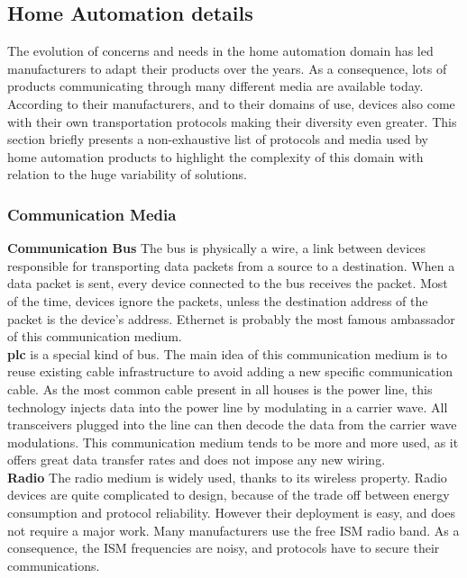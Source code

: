 \subsection{Home Automation details}
\label{subsection:homeAutomationDetails}

The evolution of concerns and needs in the home automation domain has led manufacturers to adapt their products over the years. As a consequence, lots of products communicating through many different media are available today. According to their manufacturers, and to their domains of use, devices also come with their own transportation protocols making their diversity even greater. This section briefly presents a non-exhaustive list of protocols and media used by home automation products to highlight the complexity of this domain with relation to the huge variability of solutions.\\

\subsubsection{Communication Media}

{\bf Communication Bus} The bus is physically a wire, a link between devices responsible for transporting data packets from a source to a destination. When a data packet is sent, every device connected to the bus receives the packet. Most of the time, devices ignore the packets, unless the destination address of the packet is the device's address. Ethernet is probably the most famous ambassador of this communication medium.\\

{\bf \gls{plc}} is a special kind of bus. The main idea of this communication medium is to reuse existing cable infrastructure to avoid adding a new specific communication cable. As the most common cable present in all houses is the power line, this technology injects data into the power line by modulating in a carrier wave. All transceivers plugged into the line can then decode the data from the carrier wave modulations.
This communication medium tends to be more and more used, as it offers great data transfer rates and does not impose any new wiring.\\

{\bf Radio} The radio medium is widely used, thanks to its wireless property. Radio devices are quite complicated to design, because of the trade off between energy consumption and protocol reliability. However their deployment is easy, and does not require a major work.
Many manufacturers use the free ISM radio band. As a consequence, the ISM frequencies are noisy, and protocols have to secure their communications.\\


